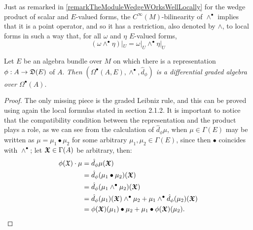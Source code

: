 \begin{remark}\label{remarkWedgeofEVectorValuedFOrmsRestrictedLocal}
Just as remarked in \ref{remarkTheModuleWedgeWOrksWellLocally} for the wedge product of scalar and $E$-valued forms, the $C^\infty(M)$-bilinearity of $\wedge^\bullet$ implies that it is a point operator, and so it has a restriction, also denoted by $\wedge$, to local forms in such a way that, for all $\omega$ and $\eta$ $E$-valued forms,
\begin{equation}
    (\omega \wedge^\bullet \eta)|_U = \omega|_U \wedge^\bullet \eta|_U
\end{equation}
\end{remark}

\begin{theorem} \label{theoFormsAreDiffGAlgebebra}
Let $E$ be an algebra bundle over $M$ on which there is a representation $\phi: A \to \alg D(E)$ of $A$. \textit{Then $(\Omega^\bullet(A, E), \wedge^\bullet, \hat d_\phi)$ is a differential graded algebra over $\Omega^\bullet(A)$}.
\end{theorem}

\begin{proof}
The only missing piece is the graded Leibniz rule, and this can be proved using again the local formulas stated in section 2.1.2. It is important to notice that the compatibility condition between the representation and the product plays a role, as we can see from the calculation of $\hat d_\phi \mu$, when $\mu \in \Gamma(E)$ may be written as $\mu = \mu_1 \bullet \mu_2$ for some arbitrary $\mu_1, \mu_2 \in \Gamma(E)$, since then $\bullet$ coincides with $\wedge^\bullet$; let $\bm{\mathfrak{X}} \in \Gamma(A)$ be arbitrary, then:
\begin{align*}
    \phi(\oid X) \cdot \mu &= \hat d_\phi \mu(\sectoid X)\\
        &= \hat d_\phi (\mu_1 \bullet \mu_2)(\sectoid X) \\
        &= \hat d_\phi (\mu_1 \wedge^\bullet \mu_2)(\sectoid X)\\
        &= \hat d_\phi(\mu_1)(\sectoid X) \wedge^\bullet \mu_2 + \mu_1 \wedge^\bullet \hat d_\phi(\mu_2)(\sectoid X)\\
        &= \phi(\sectoid X)(\mu_1) \bullet \mu_2 + \mu_1 \bullet \phi(\sectoid X)(\mu_2).
\end{align*}

\end{proof}

